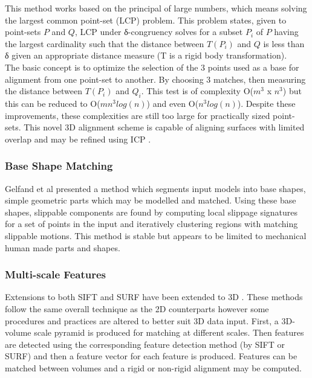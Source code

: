 This method works based on the principal of large numbers, which means solving the largest common point-set (LCP) problem. This problem states, given to point-sets $P$ and $Q$, LCP under δ-congruency solves for a subset $P_i$ of $P$ having the largest cardinality such that the distance between $T(P_i)$ and $Q$  is less than δ given an appropriate distance measure (T is a rigid body transformation). \\

The basic concept is to optimize the selection of the 3 points used as a base for alignment from one point-set to another. By choosing 3 matches, then measuring the distance between $T(P_i)$ and $Q_i$. This test is of complexity  O($m^3$ x $n^3$) but this can be reduced to  O($mn^3 log(n)$) \cite{Irani96Combinatorial} and even O($n^3 log(n)$). Despite these improvements, these complexities are still too large for practically sized point-sets. This novel 3D alignment scheme is capable of aligning surfaces with limited overlap and may be refined using ICP \cite{Rusinkiewicz01Efficient}. \\


\subsubsection{Base Shape Matching}

Gelfand et al \cite{Gelfand04Shape} presented a method which segments input models into base shapes, simple geometric parts which may be modelled and matched. Using these base shapes, slippable components are found by computing local slippage signatures for a set of points in the input and iteratively clustering regions with matching slippable motions. This method is stable but appears to be limited to mechanical human made parts and shapes.

\subsubsection{Multi-scale Features}

Extensions to both SIFT and SURF have been extended to 3D \cite{Scovanner073Dimensional,Flitton10Object}. These methods follow the same overall technique as the 2D counterparts however some procedures and practices are altered to better suit 3D data input. First, a 3D-volume scale pyramid is produced for matching at different scales. Then features are detected using the corresponding feature detection method (by SIFT or SURF) and then a feature vector for each feature is produced. Features can be matched between volumes and a rigid or non-rigid alignment may be computed. \\

